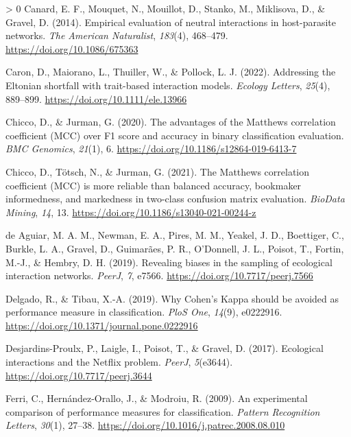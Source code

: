 \documentclass[11pt]{article}
\newlength{\cslhangindent}
\newenvironment{CSLReferences}[3] %
 {%
  \setlength{\parindent}{0pt}
  \ifodd #1 \everypar{\setlength{\hangindent}{\cslhangindent}}\ignorespaces\fi
  \ifnum #2 > 0
  \setlength{\parskip}{#2\baselineskip}
  \fi
 }%
 {}
\begin{document}
\begin{CSLReferences}{1}{0}
\leavevmode\hypertarget{ref-Canard2014EmpEva}{}%
Canard, E. F., Mouquet, N., Mouillot, D., Stanko, M., Miklisova, D., \&
Gravel, D. (2014). Empirical evaluation of neutral interactions in
host-parasite networks. \emph{The American Naturalist}, \emph{183}(4),
468--479. \url{https://doi.org/10.1086/675363}

\leavevmode\hypertarget{ref-Caron2022AddElt}{}%
Caron, D., Maiorano, L., Thuiller, W., \& Pollock, L. J. (2022).
Addressing the Eltonian shortfall with trait-based interaction models.
\emph{Ecology Letters}, \emph{25}(4), 889--899.
\url{https://doi.org/10.1111/ele.13966}

\leavevmode\hypertarget{ref-Chicco2020AdvMat}{}%
Chicco, D., \& Jurman, G. (2020). The advantages of the Matthews
correlation coefficient (MCC) over F1 score and accuracy in binary
classification evaluation. \emph{BMC Genomics}, \emph{21}(1), 6.
\url{https://doi.org/10.1186/s12864-019-6413-7}

\leavevmode\hypertarget{ref-Chicco2021MatCor}{}%
Chicco, D., Tötsch, N., \& Jurman, G. (2021). The Matthews correlation
coefficient (MCC) is more reliable than balanced accuracy, bookmaker
informedness, and markedness in two-class confusion matrix evaluation.
\emph{BioData Mining}, \emph{14}, 13.
\url{https://doi.org/10.1186/s13040-021-00244-z}

\leavevmode\hypertarget{ref-deAguiar2019RevBia}{}%
de Aguiar, M. A. M., Newman, E. A., Pires, M. M., Yeakel, J. D.,
Boettiger, C., Burkle, L. A., Gravel, D., Guimarães, P. R., O'Donnell,
J. L., Poisot, T., Fortin, M.-J., \& Hembry, D. H. (2019). Revealing
biases in the sampling of ecological interaction networks. \emph{PeerJ},
\emph{7}, e7566. \url{https://doi.org/10.7717/peerj.7566}

\leavevmode\hypertarget{ref-Delgado2019WhyCoh}{}%
Delgado, R., \& Tibau, X.-A. (2019). Why Cohen's Kappa should be avoided
as performance measure in classification. \emph{PloS One}, \emph{14}(9),
e0222916. \url{https://doi.org/10.1371/journal.pone.0222916}

\leavevmode\hypertarget{ref-Desjardins-Proulx2017EcoInt}{}%
Desjardins-Proulx, P., Laigle, I., Poisot, T., \& Gravel, D. (2017).
Ecological interactions and the Netflix problem. \emph{PeerJ},
\emph{5}(e3644). \url{https://doi.org/10.7717/peerj.3644}

\leavevmode\hypertarget{ref-Ferri2009ExpCom}{}%
Ferri, C., Hernández-Orallo, J., \& Modroiu, R. (2009). An experimental
comparison of performance measures for classification. \emph{Pattern
Recognition Letters}, \emph{30}(1), 27--38.
\url{https://doi.org/10.1016/j.patrec.2008.08.010}


\end{CSLReferences}
\end{document}
